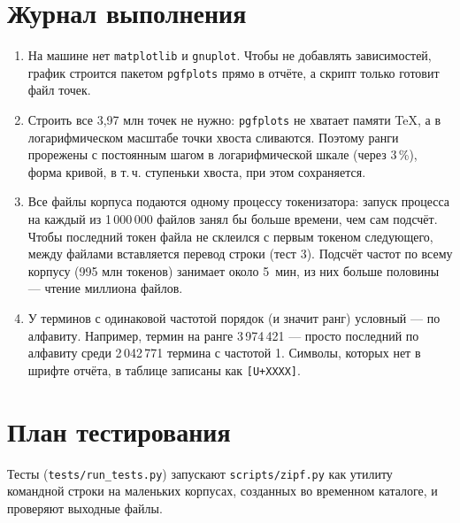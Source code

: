 \section{Журнал выполнения}
\begin{enumerate}
    \item На машине нет \texttt{matplotlib} и \texttt{gnuplot}. Чтобы не добавлять зависимостей, график строится пакетом \texttt{pgfplots} прямо в отчёте, а скрипт только готовит файл точек.
    \item Строить все 3,97 млн точек не нужно: \texttt{pgfplots} не хватает памяти \TeX, а в логарифмическом масштабе точки хвоста сливаются. Поэтому ранги прорежены с постоянным шагом в логарифмической шкале (через 3\,\%), форма кривой, в т.\,ч. ступеньки хвоста, при этом сохраняется.
    \item Все файлы корпуса подаются одному процессу токенизатора: запуск процесса на каждый из 1\,000\,000 файлов занял бы больше времени, чем сам подсчёт. Чтобы последний токен файла не склеился с первым токеном следующего, между файлами вставляется перевод строки (тест 3). Подсчёт частот по всему корпусу (995 млн токенов) занимает около 5~мин, из них больше половины --- чтение миллиона файлов.
    \item У терминов с одинаковой частотой порядок (и значит ранг) условный --- по алфавиту. Например, термин на ранге 3\,974\,421 --- просто последний по алфавиту среди 2\,042\,771 термина с частотой 1. Символы, которых нет в шрифте отчёта, в таблице записаны как \texttt{[U+XXXX]}.
\end{enumerate}

\section{План тестирования}
Тесты (\texttt{tests/run\_tests.py}) запускают \texttt{scripts/zipf.py} как утилиту командной строки на маленьких корпусах, созданных во временном каталоге, и проверяют выходные файлы.

